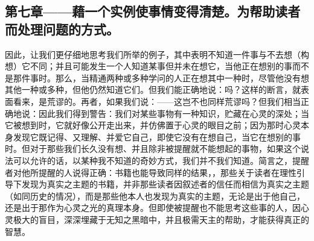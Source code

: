 
\subsection{第七章——藉一个实例使事情变得清楚。为帮助读者而处理问题的方式。}

因此，让我们更仔细地思考我们所举的例子，其中表明不知道一件事与不去想（构想）它不同；并且可能发生一个人知道某事但并未在想它，当他正在想别的事而不是那件事时。那么，当精通两种或多种学问的人正在想其中一种时，尽管他没有想其他一种或多种，但他仍然知道它们。但我们能正确地说：吗？这样的断言，就表面看来，是荒谬的。再者，如果我们说：——这岂不也同样荒谬吗？但我们相当正确地说：因此我们得到警告：我们对某些事物有一种知识，贮藏在心灵的深处；当它被想到时，它就好像公开走出来，并仿佛置于心灵的眼目之前；因为那时心灵本身发现它既记得、又理解、并爱它自己，即使它没有在想自己，当它在想别的事时。但对于那些我们长久没有想、并且除非被提醒就不能想起的事物，如果这个说法可以允许的话，以某种我不知道的奇妙方式，我们并不我们知道。简言之，提醒者对他所提醒的人说得正确：书籍也能导致同样的结果，，那些关于读者在理性引导下发现为真实之主题的书籍，并非那些读者因叙述者的信任而相信为真实之主题（如同历史的情况），而是那些他本人也发现为真实的主题，无论是出于他自己，还是出于那作为心灵之光的真理本身。但即使被提醒也不能思考这些事的人，因心灵极大的盲目，深深埋藏于无知之黑暗中，并且极需天主的帮助，才能获得真正的智慧。\par

